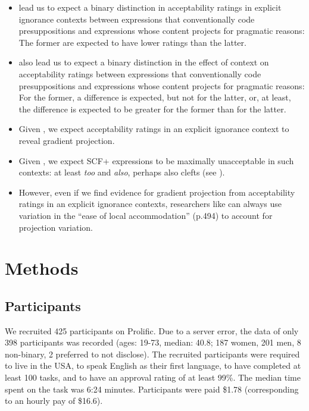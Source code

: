 \documentclass[11pt,fleqn]{article}
\newcommand{\6}{\mbox{$[\hspace*{-.6mm}[$}}
\newcommand{\9}{\mbox{$]\hspace*{-.6mm}]$}}
\begin{document}
\begin{itemize}
\item \citealt{mandelkern-etal2020} lead us to expect a binary distinction in acceptability ratings in explicit ignorance contexts between expressions that conventionally code presuppositions and expressions whose content projects for pragmatic reasons: The former are expected to have lower ratings than the latter.

\item \citealt{mandelkern-etal2020} also lead us to expect a binary distinction in the effect of context on acceptability ratings between expressions that conventionally code presuppositions and expressions whose content projects for pragmatic reasons: For the former, a difference is expected, but not for the latter, or, at least, the difference is expected to be greater for the former than for the latter. 

\item Given \citealt{degen-tonhauser-openmind,degen-tonhauser-language}, we expect acceptability ratings in an explicit ignorance context to  reveal gradient projection. 

\item Given \citealt{brst-lang11}, we expect SCF+ expressions to be maximally unacceptable in such contexts: at least {\em too} and {\em also}, perhaps also clefts (see \citealt{abusch10}). 

\item However, even if we find evidence for gradient projection from acceptability ratings in an explicit ignorance contexts, researchers like \citealt{mandelkern-etal2020} can always use variation in the ``ease of local accommodation'' (p.494) to account for projection variation. 

\end{itemize}


\section{Methods}\label{s-methods}

\subsection{Participants}

We recruited 425 participants on Prolific. Due to a server error, the data of only 398 participants was recorded (ages: 19-73, median: 40.8; 187 women, 201 men, 8 non-binary, 2 preferred to not disclose). The recruited participants were required to live in the USA, to speak English as their first language, to have completed at least 100 tasks, and to have an approval rating of at least 99\%. The median time spent on the task was 6:24 minutes. Participants were paid \$1.78 (corresponding to an hourly pay of \$16.6).
\end{document}
